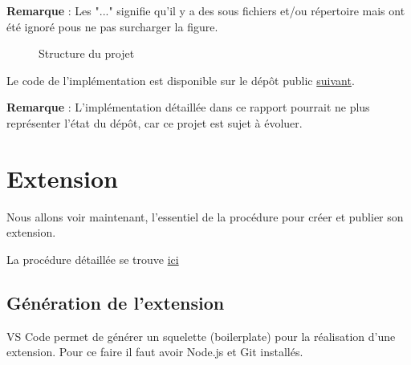 \documentclass[
    iict, %
    il, %
]{heig-tb}
\begin{document}
\textbf{Remarque} : Les "..." signifie qu'il y a des sous fichiers et/ou répertoire mais ont été ignoré pous ne pas surcharger
la figure.

\begin{figure}[!h]
    \centering
    \caption{Structure du projet}
    \label{project-structure}
\end{figure}

Le code de l'implémentation est disponible sur le dépôt public \href{https://github.com/vitorva/vscode-uon}{suivant}.

\textbf{Remarque} : L'implémentation détaillée dans ce rapport pourrait ne plus représenter l'état du dépôt, car ce projet est sujet à évoluer.

\section{Extension}
Nous allons voir maintenant, l'essentiel de la procédure pour créer et publier son extension.

La procédure détaillée se trouve \href{https://code.visualstudio.com/api/get-started/your-first-extension
}{ici}

\subsection{Génération de l'extension}

VS Code permet de générer un squelette (boilerplate) pour la réalisation d'une extension.
Pour ce faire il faut avoir Node.js et Git installés.
\end{document}
